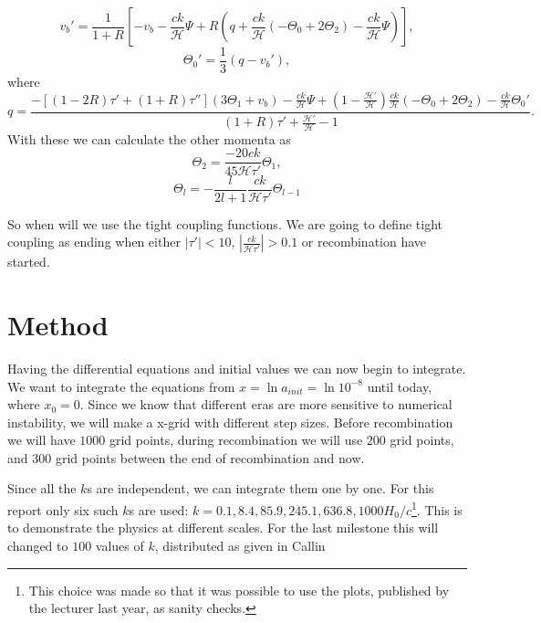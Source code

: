 \documentclass[a4paper,norsk, 10pt]{article}
\begin{document}
\begin{equation}
v_b' = \frac{1}{1+R}\left[-v_b - \frac{ck}{\mathcal{H}}\Psi + R(q + \frac{ck}{\mathcal{H}}(-\Theta_0 + 2\Theta_2) - \frac{ck}{\mathcal{H}}\Psi)\right],
\end{equation}
\begin{equation}
\Theta_0' = \frac{1}{3}(q - v_b'),
\end{equation}
where 
\begin{equation}
q = \frac{-[(1-2R)\tau' + (1+R)\tau''](3\Theta_1 + v_b) - \frac{ck}{\mathcal{H}}\Psi + (1-\frac{\mathcal{H}'}{\mathcal{H}})\frac{ck}{\mathcal{H}}(-\Theta_0 + 2\Theta_2) - \frac{ck}{\mathcal{H}}\Theta_0'}{(1+R)\tau' + \frac{\mathcal{H}'}{\mathcal{H}} - 1}.
\end{equation}
With these we can calculate the other momenta as
\begin{equation}
\Theta_2 = \frac{-20ck}{45\mathcal{H}\tau'}\Theta_1,
\end{equation}
\begin{equation}
\Theta_l = -\frac{l}{2l+1}\frac{ck}{\mathcal{H}\tau'}\Theta_{l-1}
\end{equation}

So when will we use the tight coupling functions. We are going to define tight coupling as ending when either $|\tau'| < 10$, $\left|\frac{ck}{\mathcal{H}\tau'}\right|>0.1$ or recombination have started.

\section{Method}
Having the differential equations and initial values we can now begin to integrate. We want to integrate the equations from $x = \ln a_{init} = \ln 10^{-8}$ until today, where $x_0 = 0$. Since we know that different eras are more sensitive to numerical instability, we will make a x-grid with different step sizes. Before recombination we will have $1000$ grid points, during recombination we will use $200$ grid points, and $300$ grid points between the end of recombination and now. 

Since all the $k$s are independent, we can integrate them one by one. For this report only six such $k$s are used: $k = 0.1, 8.4, 85.9, 245.1, 636.8, 1000 H_0/c$\footnote{This choice was made so that it was possible to use the plots, published by the lecturer last year, as sanity checks.}. This is to demonstrate the physics at different scales. For the last milestone this will changed to $100$ values of $k$, distributed as given in Callin \cite{callin}
\end{document}

